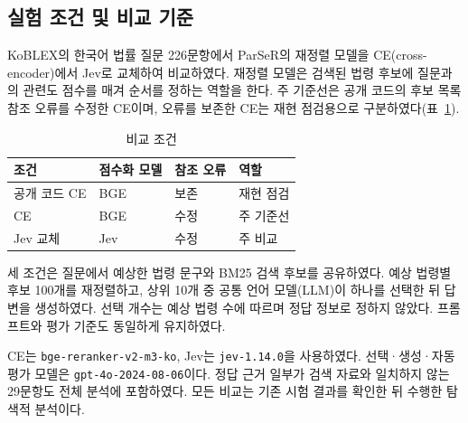 \subsection{실험 조건 및 비교 기준}
\label{sec:ch4_conditions}

KoBLEX의 한국어 법률 질문 226문항에서 ParSeR의 재정렬 모델을 CE(cross-encoder)에서 Jev로 교체하여 비교하였다. 재정렬 모델은 검색된 법령 후보에 질문과의 관련도 점수를 매겨 순서를 정하는 역할을 한다. 주 기준선은 공개 코드의 후보 목록 참조 오류를 수정한 CE이며, 오류를 보존한 CE는 재현 점검용으로 구분하였다(표~\ref{tab:ch4_conditions}).

\begin{table}[htbp]
\centering
\caption{비교 조건}
\label{tab:ch4_conditions}
\small
\setlength{\tabcolsep}{3pt}
\begin{tabular}{@{}llll@{}}
\hline
조건 & 점수화 모델 & 참조 오류 & 역할 \\
\hline
공개 코드 CE & BGE & 보존 & 재현 점검 \\
CE & BGE & 수정 & 주 기준선 \\
Jev 교체 & Jev & 수정 & 주 비교 \\
\hline
\end{tabular}
\end{table}

세 조건은 질문에서 예상한 법령 문구와 BM25 검색 후보를 공유하였다. 예상 법령별 후보 100개를 재정렬하고, 상위 10개 중 공통 언어 모델(LLM)이 하나를 선택한 뒤 답변을 생성하였다. 선택 개수는 예상 법령 수에 따르며 정답 정보로 정하지 않았다. 프롬프트와 평가 기준도 동일하게 유지하였다.

CE는 \texttt{bge-reranker-v2-m3-ko}, Jev는 \texttt{jev-1.14.0}을 사용하였다. 선택·생성·자동 평가 모델은 \texttt{gpt-4o-2024-08-06}이다. 정답 근거 일부가 검색 자료와 일치하지 않는 29문항도 전체 분석에 포함하였다. 모든 비교는 기존 시험 결과를 확인한 뒤 수행한 탐색적 분석이다.
